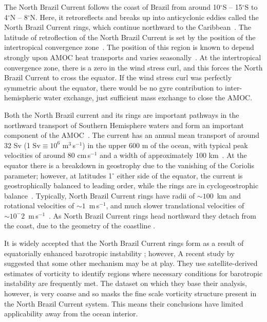 The North Brazil Current follows the coast of Brazil from around 10$^\circ$S -- 15$^\circ$S to 4$^\circ$N -- 8$^\circ$N. Here, it retroreflects and breaks up into anticyclonic eddies called the North Brazil Current rings, which continue northward to the Caribbean~\citep{Bourles1999, Garzoli2003, Fratantoni2006, Talley2011AtlOce}. The latitude of retroflection of the North Brazil Current is set by the position of the intertropical convergence zone~\citep{Fonseca2004}. The position of this region is known to depend strongly upon AMOC heat transports and varies seasonally~\citep{Zhang2005, Fuckar2013}. At the intertropical convergence zone, there is a zero in the wind stress curl, and this forces the North Brazil Current to cross the equator. If the wind stress curl was perfectly symmetric about the equator, there would be no gyre contribution to inter-hemispheric water exchange, just sufficient mass exchange to close the AMOC.

Both the North Brazil current and its rings are important pathways in the northward transport of Southern Hemisphere waters and form an important component of the AMOC~\citep{Zhang2011, Bower2019}. The current has an annual mean transport of around 32 Sv (1 Sv$\equiv 10^{6}$ m$^3$\,s$^{-1}$) in the upper 600 m of the ocean, with typical peak velocities of around 80 cm\,s$^{-1}$ and a width of approximately 100 km~\citep{Schott1993, Johns1998, Barnier2001}. At the equator there is a breakdown in geostrophy due to the vanishing of the Coriolis parameter; however, at latitudes 1$^\circ$ either side of the equator, the current is geostrophically balanced to leading order, while the rings are in cyclogeostrophic balance~\citep{Vianna2003, Castelao2011}. Typically, North Brazil Current rings have radii of $\sim 100$~km and rotational velocities of $\sim 1$~m\,s$^{-1}$, and much slower translational velocities of $\sim 10^-{2}$~m\,s$^{-1}$~\citep{Castelao2011}. As North Brazil Current rings head northward they detach from the coast, due to the geometry of the coastline \citep{Nof1996b, Nof1996, Zharkov2010, Deremble2017}.

It is widely accepted that the North Brazil Current rings form as a result of equatorially enhanced barotropic instability \citep[e.g.][]{Edwards1998II, Goes2009}; however, A recent study by \citet{Aguedjou2019} suggested that some other mechanism may be at play. They use satellite-derived estimates of vorticity to identify regions where necessary conditions for barotropic instability are frequently met. The dataset on which they base their analysis, however, is very coarse and so masks the fine scale vorticity structure present in the North Brazil Current system. This means their conclusions have limited applicability away from the ocean interior.


